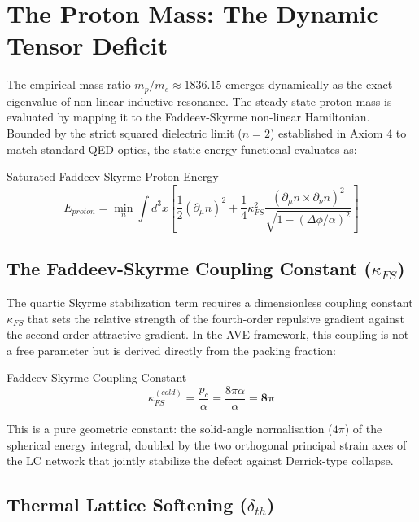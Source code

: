 \section{The Proton Mass: The Dynamic Tensor Deficit}

The empirical mass ratio $m_p/m_e \approx 1836.15$ emerges dynamically as the exact eigenvalue of non-linear inductive resonance. The steady-state proton mass is evaluated by mapping it to the Faddeev-Skyrme non-linear Hamiltonian. Bounded by the strict squared dielectric limit ($n=2$) established in Axiom 4 to match standard QED optics, the static energy functional evaluates as:
\begin{resultbox}{Saturated Faddeev-Skyrme Proton Energy}
\begin{equation}
E_{proton} = \min_{n} \int d^3x \left[ \frac{1}{2}(\partial_\mu n)^2 + \frac{1}{4}\kappa_{FS}^2 \frac{(\partial_\mu n \times \partial_\nu n)^2}{\sqrt{1 - (\Delta\phi / \alpha)^2}} \right]
\end{equation}
\end{resultbox}

\subsection{The Faddeev-Skyrme Coupling Constant ($\kappa_{FS}$)}

The quartic Skyrme stabilization term requires a dimensionless coupling constant $\kappa_{FS}$ that sets the relative strength of the fourth-order repulsive gradient against the second-order attractive gradient. In the AVE framework, this coupling is not a free parameter but is derived directly from the packing fraction:
\begin{resultbox}{Faddeev-Skyrme Coupling Constant}
\begin{equation}
\kappa_{FS}^{(cold)} = \frac{p_c}{\alpha} = \frac{8\pi\alpha}{\alpha} = \mathbf{8\pi}
\end{equation}
\end{resultbox}

This is a pure geometric constant: the solid-angle normalisation ($4\pi$) of the spherical energy integral, doubled by the two orthogonal principal strain axes of the LC network that jointly stabilize the defect against Derrick-type collapse.

\subsection{Thermal Lattice Softening ($\delta_{th}$)}
\label{sec:thermal_softening}

